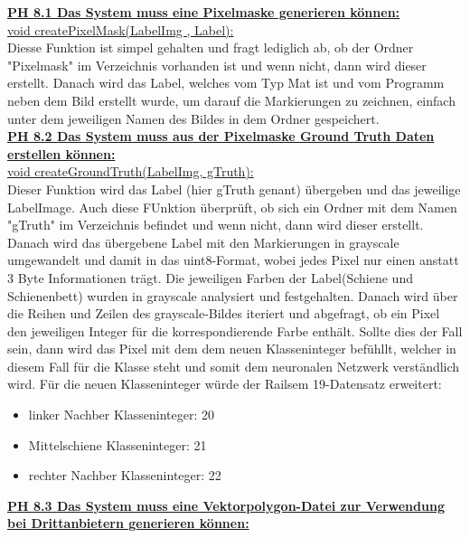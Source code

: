 \documentclass[11pt]{scrartcl}
\begin{document}
\noindent
\underline{\textbf {PH 8.1  Das System muss eine Pixelmaske generieren können:}}
\\

\noindent
\underline{ void createPixelMask(LabelImg , Label):}
\\

\noindent
Diesse Funktion ist simpel gehalten und fragt lediglich ab, ob der Ordner "Pixelmask" im Verzeichnis vorhanden ist und wenn nicht, dann wird dieser erstellt. Danach wird das Label, welches vom Typ Mat ist und vom Programm neben dem Bild erstellt wurde, um darauf die Markierungen zu zeichnen, einfach unter dem jeweiligen Namen des Bildes in dem Ordner gespeichert. 
\\

\noindent
\underline{\textbf {PH 8.2 Das System muss aus der Pixelmaske Ground Truth Daten erstellen können:}}
\\

\noindent
\underline{void createGroundTruth(LabelImg, gTruth):}
\\

\noindent
Dieser Funktion wird  das Label (hier gTruth genant) übergeben und das jeweilige LabelImage. Auch diese FUnktion überprüft, ob sich ein Ordner mit dem Namen "gTruth" im Verzeichnis befindet und wenn nicht, dann wird dieser erstellt. Danach wird das übergebene Label mit den Markierungen in grayscale umgewandelt und damit in das uint8-Format, wobei jedes Pixel nur einen anstatt 3 Byte Informationen trägt. Die jeweiligen Farben der Label(Schiene und Schienenbett) wurden in grayscale analysiert und festgehalten. Danach wird über die Reihen und Zeilen des grayscale-Bildes iteriert und abgefragt, ob ein Pixel den jeweiligen Integer für die korrespondierende Farbe enthält. Sollte dies der Fall sein, dann wird das Pixel mit dem dem neuen Klasseninteger befühllt, welcher in diesem Fall für die Klasse steht und somit dem neuronalen Netzwerk verständlich wird. Für die neuen Klasseninteger würde der Railsem 19-Datensatz erweitert:
\begin{itemize}
	\item linker Nachber Klasseninteger: 20
	\item Mittelschiene Klasseninteger: 21
	\item rechter Nachber Klasseninteger: 22
\end{itemize}

\noindent
\underline{\textbf {PH 8.3 Das System muss eine Vektorpolygon-Datei zur Verwendung bei Drittanbietern generieren können:}}
\\
\end{document}
